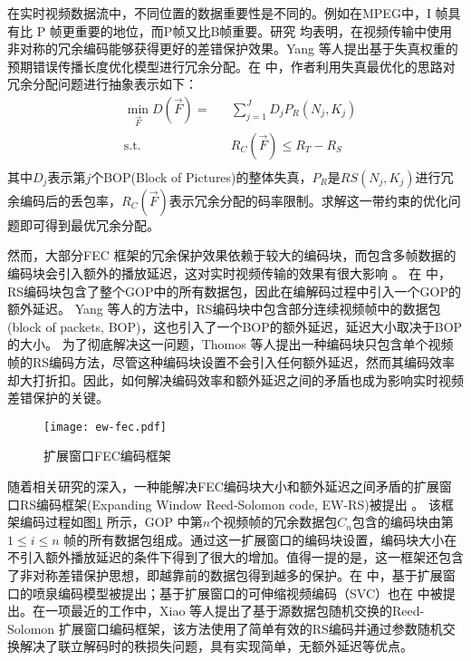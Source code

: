 在实时视频数据流中，不同位置的数据重要性是不同的。例如在MPEG中，I 帧具有比 P 帧更重要的地位，而P帧又比B帧重要。研究 \cite{yang2005unequal, zhang2011transmission, zhang2012novel, zhou2014novel} 均表明，在视频传输中使用非对称的冗余编码能够获得更好的差错保护效果。Yang \cite{yang2005unequal} 等人提出基于失真权重的预期错误传播长度优化模型进行冗余分配。在 \cite{zhang2011transmission} 中，作者利用失真最优化的思路对冗余分配问题进行抽象表示如下：
\begin{equation}
\begin{aligned}
& \underset{\vec F}{\min}D(\vec F) =
& &  \sum_{j=1}^J D_j P_R(N_j, K_j) \\
& \text{s.t.}
& & R_C(\vec F) \le R_T - R_S \\
\end{aligned}
\end{equation}
其中$D_j$表示第$j$个BOP(Block of Pictures)的整体失真，$P_R$是$RS(N_j, K_j)$进行冗余编码后的丢包率，$R_C(\vec F)$表示冗余分配的码率限制。求解这一带约束的优化问题即可得到最优冗余分配。

然而，大部分FEC 框架的冗余保护效果依赖于较大的编码块，而包含多帧数据的编码块会引入额外的播放延迟，这对实时视频传输的效果有很大影响 \cite{wang2000error}。
在 \cite{baccaglini2008slice, bouabdallah2006dependency} 中，RS编码块包含了整个GOP中的所有数据包，因此在编解码过程中引入一个GOP的额外延迟。
Yang \cite{yang2005unequal} 等人的方法中，RS编码块中包含部分连续视频帧中的数据包(block of packets, BOP)，这也引入了一个BOP的额外延迟，延迟大小取决于BOP的大小。
为了彻底解决这一问题，Thomos \cite{thomos2006robust} 等人提出一种编码块只包含单个视频帧的RS编码方法，尽管这种编码块设置不会引入任何额外延迟，然而其编码效率却大打折扣。因此，如何解决编码效率和额外延迟之间的矛盾也成为影响实时视频差错保护的关键。

\begin{figure}[htbp]
  \centering
  \texttt{[image: ew-fec.pdf]}
  \caption{扩展窗口FEC编码框架}
  \label{fig:ew_fec}
\end{figure}

随着相关研究的深入，一种能解决FEC编码块大小和额外延迟之间矛盾的扩展窗口RS编码框架(Expanding Window Reed-Solomon code, EW-RS)被提出 \cite{sejdinovic2009expanding}。 该框架编码过程如图\ref{fig:ew_fec} 所示，GOP 中第$n$个视频帧的冗余数据包$C_n$包含的编码块由第$1\le i\le n$ 帧的所有数据包组成。通过这一扩展窗口的编码块设置，编码块大小在不引入额外播放延迟的条件下得到了很大的增加。值得一提的是，这一框架还包含了非对称差错保护思想，即越靠前的数据包得到越多的保护。在 \cite{sejdinovic2009expanding, nazir2011expanding} 中，基于扩展窗口的喷泉编码模型被提出；基于扩展窗口的可伸缩视频编码（SVC）也在 \cite{vukobratovic2009scalable, hellge2011layer} 中被提出。在一项最近的工作中，Xiao \cite{xiao2013real} 等人提出了基于源数据包随机交换的Reed-Solomon 扩展窗口编码框架，该方法使用了简单有效的RS编码并通过参数随机交换解决了联立解码时的秩损失问题，具有实现简单，无额外延迟等优点。
